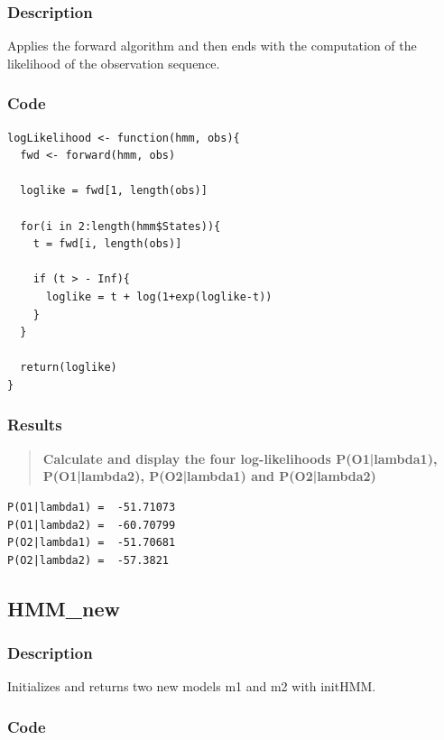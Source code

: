 \documentclass[a4paper]{article}
\begin{document}
\subsubsection{Description}

Applies the forward algorithm and then ends with the computation of the likelihood of the observation sequence.

\subsubsection{Code}

\begin{lstlisting}
logLikelihood <- function(hmm, obs){
  fwd <- forward(hmm, obs)
  
  loglike = fwd[1, length(obs)]
  
  for(i in 2:length(hmm$States)){
    t = fwd[i, length(obs)]
    
    if (t > - Inf){
      loglike = t + log(1+exp(loglike-t))
    }
  }
  
  return(loglike)
}
\end{lstlisting}

\subsubsection{Results}

\begin{quotation}
\textbf{Calculate and display the four log-likelihoods P(O1|lambda1), P(O1|lambda2), P(O2|lambda1) and P(O2|lambda2)}
\end{quotation}

\begin{lstlisting}
P(O1|lambda1) =  -51.71073 
P(O1|lambda2) =  -60.70799 
P(O2|lambda1) =  -51.70681 
P(O2|lambda2) =  -57.3821 
\end{lstlisting}

\subsection{HMM\_new}

\subsubsection{Description}

Initializes and returns two new models m1 and m2 with initHMM.

\subsubsection{Code}
\end{document}
